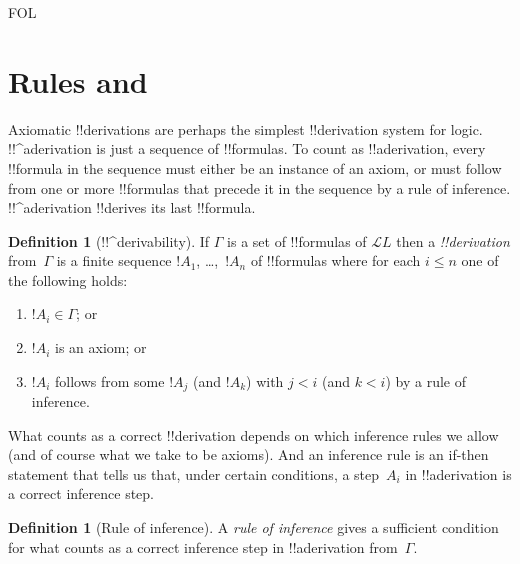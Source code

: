 \documentclass[10pt,a4paper]{article}
\theoremstyle{plain}
\theoremstyle{definition}
\newtheorem{defn}[thm]{Definition}
\theoremstyle{remark}
\newenvironment{explain}{}{}
\newcommand*{\olfileid}[3]{}
\newcommand*{\olsection}[1]{\section*{#1}}
\providecommand{\Lang}{\ensuremath{\mathcal{L}}}
\providecommand{\iftag}[1]{#1}
\begin{document}



\iftag{FOL}
      {\olfileid{fol}{axd}{rul}}
      {\olfileid{pl}{axd}{rul}}

\olsection{Rules and }

\begin{explain}
  Axiomatic !!{derivation}s are perhaps the simplest !!{derivation} system for
  logic. !!^a{derivation} is just a sequence of !!{formula}s.  To
  count as !!a{derivation}, every !!{formula} in the sequence must
  either be an instance of an axiom, or must follow from one or more
  !!{formula}s that precede it in the sequence by a rule of inference.
  !!^a{derivation} !!{derive}s its last !!{formula}.
\end{explain}

\begin{defn}[!!^{derivability}]
If $\Gamma$ is a set of !!{formula}s of $\Lang L$ then a
\emph{!!{derivation}} from~$\Gamma$ is a finite sequence $!A_1$,
\dots,~$!A_n$ of !!{formula}s where for each $i \le n$ one of the
following holds:
\begin{enumerate}
\item $!A_i \in \Gamma$; or
\item $!A_i$ is an axiom; or
\item $!A_i$ follows from some $!A_j$ (and $!A_k$) with $j < i$ (and
  $k < i$) by a rule of inference.
\end{enumerate}
\end{defn}

What counts as a correct !!{derivation} depends on which inference
rules we allow (and of course what we take to be axioms).  And an
inference rule is an if-then statement that tells us that, under
certain conditions, a step~$A_i$ in !!a{derivation} is a correct
inference step.

\begin{defn}[Rule of inference]
A \emph{rule of inference} gives a sufficient condition for what
counts as a correct inference step in !!a{derivation} from~$\Gamma$.
\end{defn}
\end{document}
